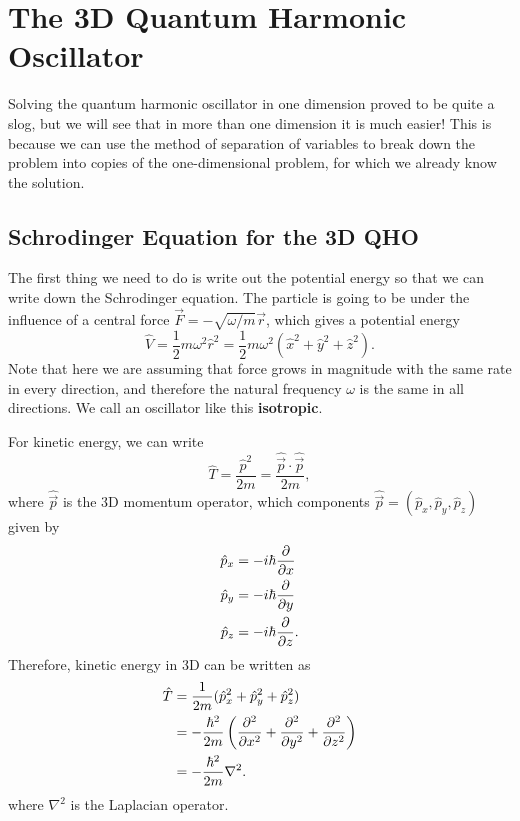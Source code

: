 \documentclass[../quantum_mechanics.tex]{subfiles}
\begin{document}
    \section{The 3D Quantum Harmonic Oscillator}\label{sec:the-3d-quantum-harmonic-oscillator}
        Solving the quantum harmonic oscillator in one dimension proved to be quite a slog, but we will see that in more than one dimension it is much easier!
        This is because we can use the method of separation of variables to break down the problem into copies of the one-dimensional problem, for which we already know the solution.

        \subsection{Schrodinger Equation for the 3D QHO}\label{subsec:schrodinger-equation-for-the-3d-qho}
            The first thing we need to do is write out the potential energy so that we can write down the Schrodinger equation.
            The particle is going to be under the influence of a central force $\vec{F}=-\sqrt{\omega/m}\vec{r}$, which gives a potential energy
            \begin{equation}
                \hat{V}=\frac{1}{2}m\omega^2\hat{r}^2=\frac{1}{2}m\omega^2(\hat{x}^2+\hat{y}^2+\hat{z}^2).
            \end{equation}
            Note that here we are assuming that force grows in magnitude with the same rate in every direction, and therefore the natural frequency $\omega$ is the same in all directions.
            We call an oscillator like this \textbf{isotropic}.

            For kinetic energy, we can write
            \begin{equation}
                \hat{T}=\frac{\hat{p}^2}{2m}=\frac{\hat{\vec{p}}\cdot\hat{\vec{p}}}{2m},
            \end{equation}
            where $\hat{\vec{p}}$ is the 3D momentum operator, which components $\hat{\vec{p}}=(\hat{p}_x,\hat{p}_y,\hat{p}_z)$ given by
            \begin{align}
                \hat{p}_x&=-i\hbar\pdv{}{x}\\
                \hat{p}_y&=-i\hbar\pdv{}{y}\\
                \hat{p}_z&=-i\hbar\pdv{}{z}.
            \end{align}
            Therefore, kinetic energy in 3D can be written as
            \begin{align}
                \hat{T}&=\frac{1}{2m}(\hat{p}_x^2+\hat{p}_y^2+\hat{p}_z^2)\\
                &=-\frac{\hbar^2}{2m}\left(\pdv[2]{}{x}+\pdv[2]{}{y}+\pdv[2]{}{z}\right)\\
                &=-\frac{\hbar^2}{2m}\nabla^2.
            \end{align}
            where $\nabla^2$ is the Laplacian operator.
\end{document}

